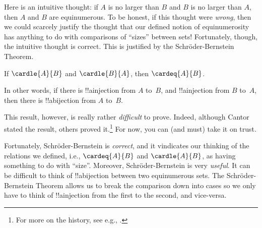 \documentclass[../../../include/open-logic-section]{subfiles}
\begin{document}


\begin{explain}
Here is an intuitive thought: if $A$ is no larger than $B$ and $B$ is
no larger than $A$, then $A$ and $B$ are equinumerous. To be honest,
if this thought were \emph{wrong}, then we could scarcely justify the
thought that our defined notion of equinumerosity has anything to do
with comparisons of ``sizes'' between sets!{} Fortunately, though,
the intuitive thought is correct. This is justified by the
Schr\"oder-Bernstein Theorem.
\end{explain}

\begin{thm}
	If $\cardle{A}{B}$ and $\cardle{B}{A}$,
	then $\cardeq{A}{B}$.
\end{thm}

\begin{explain}
In other words, if there is !!a{injection} from $A$ to~$B$, and
!!a{injection} from $B$ to~$A$, then there is !!a{bijection} from $A$
to~$B$. 

This result, however, is really rather \emph{difficult} to prove.
Indeed, although Cantor stated the result, others proved
it.\footnote{For more on the history, see e.g.,
\citet[pp.~165--6]{Potter2004}.}
% 
For now, you can (and must)
take it on trust. 

Fortunately, Schr\"oder-Bernstein is \emph{correct}, and it
vindicates our thinking of the relations we defined, i.e.,
$\cardeq{A}{B}$ and $\cardle{A}{B}$, as having something to do with
``size''. Moreover, Schr\"oder-Bernstein is very \emph{useful}. It
can be difficult to think of !!a{bijection} between two equinumerous
sets. The Schr\"oder-Bernstein Theorem allows us to break the comparison
down into cases so we only have to think of !!a{injection} from the
first to the second, and vice-versa.
\end{explain}
\end{document}
